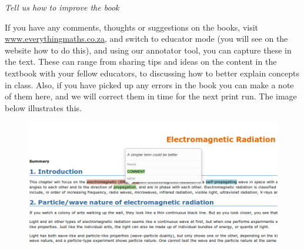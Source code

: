 \pagebreak
{\normalfont\sffamily\fontsize{22}\normalfont\itshape Tell us how to improve the book} \par

{\Large
If you have any comments, thoughts or suggestions on the books, visit \underline{www.everythingmaths.co.za}, and
switch to educator mode (you will see on the website how to do this), and using our annotator tool, you can
capture these in the text. These can range from sharing tips and ideas on the content in the textbook with
your fellow educators, to discussing how to better explain concepts in class. Also, if you have picked up any
errors in the book you can make a note of them here, and we will correct them in time for the next print run.
The image below illustrates this.
 \par


\begin{figure}[H]
\centering
\includegraphics[width=\textwidth]{../title_images/annotater.png}
\end{figure}


}
% 
% 
% 
% 


